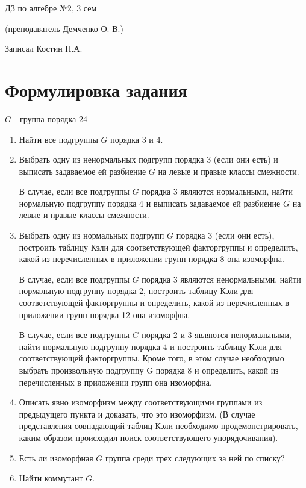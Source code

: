 \documentclass[11pt, fleqn]{article}
\begin{document}
    \begin{center}
      \huge ДЗ по алгебре №2, 3 сем

      \Large (преподаватель Демченко О. В.)

      \large Записал Костин П.А.

      \tableofcontents
    	\newpage
    \end{center}

    \section{Формулировка задания}
    \begin{task}
        $G$ - группа порядка 24
        \begin{enumerate}
          \item Найти все подгруппы $G$ порядка 3 и 4.
          \item Выбрать одну из ненормальных подгрупп порядка 3 (если они есть) и выписать задаваемое ей разбиение $G$ на левые и правые классы смежности.

          В случае, если все подгруппы $G$ порядка 3 являются нормальными, найти нормальную подгруппу порядка 4 и выписать задаваемое ей разбиение $G$ на левые и правые классы смежности.
          \item Выбрать одну из нормальных подгрупп $G$ порядка 3 (если они есть),
          построить таблицу Кэли для соответствующей факторгруппы и определить, какой из перечисленных в приложении групп порядка 8 она
          изоморфна.

          В случае, если все подгруппы $G$ порядка 3 являются ненормальными,
          найти нормальную подгруппу порядка 2, построить таблицу Кэли для
          соответствующей факторгруппы и определить, какой из перечисленных в приложении групп порядка 12 она изоморфна.

          В случае, если все подгруппы $G$ порядка 2 и 3 являются ненормальными, найти нормальную подгруппу порядка 4 и построить таблицу Кэли для соответствующей факторгруппы. Кроме того, в этом случае необходимо выбрать произвольную подгруппу G порядка 8 и определить, какой из перечисленных в приложении групп она изоморфна.
          \item Описать явно изоморфизм между соответствующими группами из предыдущего пункта и доказать, что это изоморфизм. (В случае представления совпадающий таблиц Кэли необходимо продемонстрировать, каким образом происходил поиск соответствующего упорядочивания).
          \item Есть ли изоморфная $G$ группа среди трех следующих за ней по списку?
          \item Найти коммутант $G$.
        \end{enumerate}
    \end{task}
\end{document}
